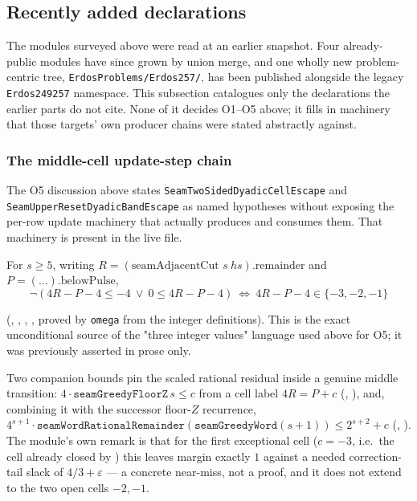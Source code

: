 \subsection{Recently added declarations}

The modules surveyed above were read at an earlier snapshot. Four already-public modules have
since grown by union merge, and one wholly new problem-centric tree,
\texttt{ErdosProblems/Erdos257/}, has been published alongside the legacy \texttt{Erdos249257}
namespace. This subsection catalogues only the declarations the earlier parts do not cite. None
of it decides O1--O5 above; it fills in machinery that those targets' own producer chains were
stated abstractly against.

\subsubsection{The middle-cell update-step chain}

The O5 discussion above states \texttt{SeamTwoSidedDyadicCellEscape} and
\texttt{SeamUpperResetDyadicBandEscape} as named hypotheses without exposing the per-row update
machinery that actually produces and consumes them. That machinery is present in the live file.

\begin{prop}
For $s\ge5$, writing $R=(\text{seamAdjacentCut } s\ hs).\mathrm{remainder}$ and
$P=(\ldots).\mathrm{belowPulse}$,
\[
\neg(4R-P-4\le-4\ \vee\ 0\le 4R-P-4)\ \Longleftrightarrow\ 4R-P-4\in\{-3,-2,-1\}
\]
\end{prop}
(,
, , , proved by \texttt{omega} from the integer
definitions). This is the exact unconditional source of the "three integer values" language used
above for O5; it was previously asserted in prose only.

Two companion bounds pin the scaled rational residual inside a genuine middle transition:
$4\cdot\mathtt{seamGreedyFloorZ}\,s\le c$ from a cell label $4R=P+c$
(, ),
and, combining it with the successor floor-$Z$ recurrence, $4^{s+1}\cdot
\mathtt{seamWordRationalRemainder}(\mathtt{seamGreedyWord}(s+1))\le 2^{s+2}+c$
(,
). The module's own remark is that for the first exceptional cell ($c=-3$, i.e.\ the cell
already closed by )
this leaves margin exactly $1$ against a needed correction-tail slack of $4/3+\varepsilon$ --- a
concrete near-miss, not a proof, and it does not extend to the two open cells $-2,-1$.

